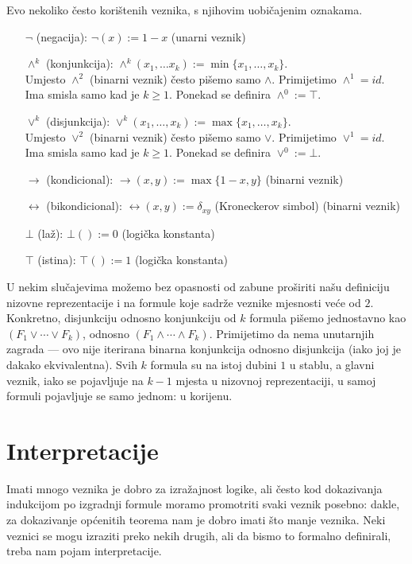 Evo nekoliko često korištenih veznika, s njihovim uobičajenim oznakama.

\begin{itemize}
\item[$\neg$] (negacija): $\neg(x):=1-x$ (unarni veznik)
\item[$\wedge^k$] (konjunkcija): $\wedge^k(x_1,\ldots x_k):=\min\{x_1,\ldots,x_k\}$.\\ Umjesto $\wedge^2$ (binarni veznik) često pišemo samo $\wedge$. Primijetimo $\wedge^1=id$.\\
Ima smisla samo kad je $k\ge 1$. Ponekad se definira $\wedge^0:=\top$.
\item[$\vee^k$] (disjunkcija): $\vee^k(x_1,\ldots,x_k):=\max\{x_1,\ldots,x_k\}$.\\ Umjesto $\vee^2$ (binarni veznik) često pišemo samo $\vee$. Primijetimo $\vee^1=id$.\\
Ima smisla samo kad je $k\ge 1$. Ponekad se definira $\vee^0:=\bot$.
\item[$\to$] (kondicional): $\to(x,y):=\max\{1-x,y\}$ (binarni veznik)
\item[$\leftrightarrow$] (bikondicional): $\leftrightarrow(x,y):=\delta_{xy}$ (Kroneckerov simbol) (binarni veznik)
\item[$\bot$] (laž): $\bot():=0$ (logička konstanta)
\item[$\top$] (istina): $\top():=1$ (logička konstanta)
\end{itemize}

U nekim slučajevima možemo bez opasnosti od zabune proširiti našu definiciju nizovne reprezentacije i na formule koje sadrže veznike mjesnosti veće od $2$. Konkretno, disjunkciju odnosno konjunkciju od $k$ formula pišemo jednostavno kao $(F_1\vee\cdots\vee F_k)$, odnosno $(F_1\wedge\cdots\wedge F_k)$. Primijetimo da nema unutarnjih zagrada --- ovo nije iterirana binarna konjunkcija odnosno disjunkcija (iako joj je dakako ekvivalentna). Svih $k$ formula su na istoj dubini $1$ u stablu, a glavni veznik, iako se pojavljuje na $k-1$ mjesta u nizovnoj reprezentaciji, u samoj formuli pojavljuje se samo jednom: u korijenu.

\section{Interpretacije}\label{sec:int}

Imati mnogo veznika je dobro za izražajnost logike, ali često kod dokazivanja indukcijom po izgradnji formule moramo promotriti svaki veznik posebno: dakle, za dokazivanje općenitih teorema nam je dobro imati što manje veznika. Neki veznici se mogu izraziti preko nekih drugih, ali da bismo to formalno definirali, treba nam pojam interpretacije.

